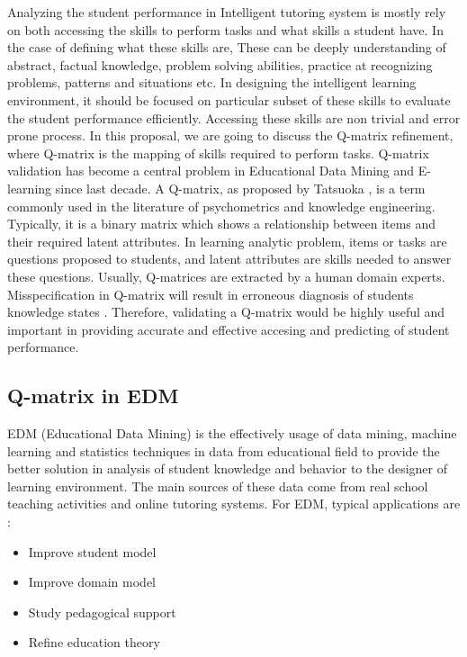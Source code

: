 \documentclass[11pt]{article}
\begin{document}
  Analyzing the student performance in Intelligent tutoring system is mostly rely on both accessing the skills to perform tasks and what skills a student have. In the case of defining what these skills are, These can be deeply understanding of abstract, factual knowledge, problem solving abilities, practice at recognizing problems, patterns and situations etc. In designing the intelligent learning environment, it should be focused on particular subset of these skills to evaluate the student performance efficiently. Accessing these skills are non trivial and error prone process. In this proposal, we are going to discuss the Q-matrix  refinement, where Q-matrix is the mapping of skills required to perform tasks. Q-matrix validation has become a central problem in Educational Data Mining and E-learning since last decade. A Q-matrix, as proposed by Tatsuoka \cite{tatsuoka1983rule}, is a term commonly used in the literature of psychometrics and knowledge engineering. Typically, it is a binary matrix which shows a relationship between items and their required latent attributes. In learning analytic problem, items or tasks are questions proposed to students, and latent attributes are skills needed to answer these questions. Usually, Q-matrices are extracted by a human domain experts. Misspecification in Q-matrix will result in erroneous diagnosis of students knowledge states \cite{rupp2008effects,madison2015effects}. Therefore, validating a Q-matrix would be highly useful and important in providing accurate and effective accesing and predicting of student performance. 
	\subsection{Q-matrix in EDM}
 EDM (Educational Data Mining) is the effectively usage of data mining, machine learning and statistics techniques in data from educational field to provide the better solution in analysis of student knowledge and behavior to the designer of learning environment. The main sources of these data come from real school teaching activities and online tutoring systems. For EDM, typical applications are \cite{baker2009state}: 
\begin{itemize}
	\item{Improve student model}
	\item{Improve domain model}
	\item{Study pedagogical support}
	\item{Refine education theory}
\end{itemize}
\end{document}
